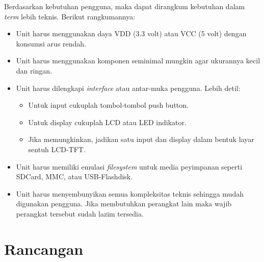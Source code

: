 \documentclass[12pt,]{article}
\begin{document}
	Berdasarkan kebutuhan pengguna, maka dapat dirangkum kebutuhan dalam \textit{term} lebih teknis.
	Berikut rangkumannya:
	\begin{itemize}
		\item Unit harus menggunakan daya VDD (3.3 volt) atau VCC (5 volt) dengan konsumsi arus rendah.

		\item Unit harus menggunakan komponen seminimal mungkin agar ukurannya kecil dan ringan.

		\item Unit harus dilengkapi \textit{interface} atau antar-muka pengguna.
		Lebih detil:
		\begin{itemize}
			\item Untuk input cukuplah tombol-tombol push button.
			\item Untuk display cukuplah LCD atau LED indikator.
			\item Jika memungkinkan, jadikan satu input dan display
			dalam bentuk layar sentuh LCD-TFT.
		\end{itemize}
		\item Unit harus memiliki emulasi \textit{filesystem} untuk media peyimpanan seperti
		SDCard, MMC, atau USB-Flashdisk.

		\item Unit harus menyembunyikan semua kompleksitas teknis sehingga mudah digunakan pengguna.
		Jika membutuhkan perangkat lain maka wajib perangkat tersebut sudah lazim tersedia.

	\end{itemize}

	\newpage
	\section{Rancangan}
\end{document}
